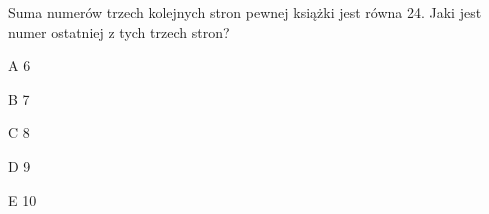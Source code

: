 \begin{tresc}
Suma numerów trzech kolejnych stron pewnej książki jest równa 24. Jaki jest numer ostatniej z tych trzech stron?
\end{tresc}
\begin{wariant}{A} 6 \end{wariant}
\begin{wariant}{B} 7 \end{wariant}
\begin{wariant}{C} 8 \end{wariant}
\begin{wariant}{D} 9 \end{wariant}
\begin{wariant}{E} 10 \end{wariant}
